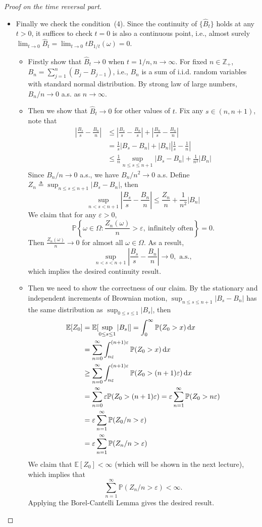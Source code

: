 \begin{proof}[Proof on the time reversal part]
\begin{itemize}
\item
Finally we check the condition~(4).
Since the continuity of $\{\hat{B}_t\}$ holds at any $t>0$, it suffices to check $t=0$ is also a
continuous point, i.e., almost surely $\lim_{t\to0}\hat{B}_t=\lim_{t\to0}tB_{1/t}(\omega)=0$.
\begin{itemize}
\item
Firstly show that $\hat{B}_t\to0$ when $t=1/n, n\to\infty$.
For fixed $n\in\mathbb{Z}_+$, $B_n=\sum_{j=1}^n(B_j-B_{j-1})$, i.e., 
$B_n$ is a sum of i.i.d. random variables with standard normal distribution.
By strong law of large numbers, $B_n/n\to0$ a.s. as $n\to\infty$.
\item
Then we show that  $\hat{B}_t\to0$ for other values of $t$.
Fix any $s\in(n,n+1)$, note that
\begin{align*}
\left|\frac{B_s}{s}-\frac{B_n}{n}\right|
&\le \left|\frac{B_s}{s}-\frac{B_n}{s}\right|+\left|\frac{B_n}{s}-\frac{B_n}{n}\right|\\
&=\frac{1}{s}|B_s-B_n| + |B_n|\left|\frac{1}{s}-\frac{1}{n}\right|\\
&\le \frac{1}{n}\sup_{n\le s\le n+1}|B_s-B_n| +\frac{1}{n^2}|B_n|
\end{align*}
Since $B_n/n\to0$ a.s., we have $B_n/n^2\to0$ a.s.
Define $Z_n\triangleq \sup_{n\le s\le n+1}|B_s-B_n|$, then
\[
\sup_{n<s<n+1}\left|\frac{B_s}{s}-\frac{B_n}{n}\right|\le \frac{Z_n}{n}+\frac{1}{n^2}|B_n|
\]
We claim that for any $\varepsilon>0$, 
\[
\mathbb{P}\left\{
\omega\in\Omega:
\frac{Z_n(\omega)}{n}>\varepsilon,~\text{infinitely often}
\right\}=0.
\]
Then $\frac{Z_n(\omega)}{n}\to0$ for almost all $\omega\in\Omega$.
As a result,
\[
\sup_{n<s<n+1}\left|\frac{B_s}{s}-\frac{B_n}{n}\right|\to0,\text{ a.s.},
\]
which implies the desired continuity result.
\item
Then we need to show the correctness of our claim.
By the stationary and independent increments of Brownian motion, 
$\sup_{n\le s\le n+1}|B_s-B_n|$ has the same distribution as $\sup_{0\le s\le 1}|B_s|$, then 
\begin{align*}
\mathbb{E}[Z_0]&=\mathbb{E}[\sup_{0\le s\le 1}|B_s|]
=\int_0^\infty\mathbb{P}(Z_0>x)\,\mathrm{d} x\\
&=\sum_{n=0}^\infty\int_{n\varepsilon}^{(n+1)\varepsilon}\mathbb{P}(Z_0>x)\,\mathrm{d} x\\
&\ge \sum_{n=0}^\infty\int_{n\varepsilon}^{(n+1)\varepsilon}\mathbb{P}(Z_0>(n+1)\varepsilon)\,\mathrm{d} x\\
&=\sum_{n=0}^\infty\varepsilon \mathbb{P}(Z_0>(n+1)\varepsilon)=\varepsilon\sum_{n=1}^\infty\mathbb{P}(Z_0>n\varepsilon)\\
&=\varepsilon\sum_{n=1}^\infty\mathbb{P}(Z_0/n>\varepsilon)\\
&=\varepsilon\sum_{n=1}^\infty\mathbb{P}(Z_n/n>\varepsilon)\\
\end{align*}
We claim that $\mathbb{E}[Z_0]<\infty$ (which will be shown in the next lecture), which implies that
\[
\sum_{n=1}^\infty\mathbb{P}(Z_n/n>\varepsilon)<\infty.
\]
Applying the Borel-Cantelli Lemma gives the desired result.


\end{itemize}
\end{itemize}
\end{proof}
